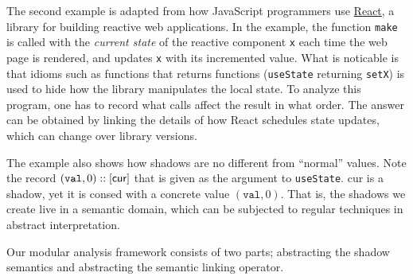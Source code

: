 The second example is adapted from how JavaScript programmers use \href{https://react.dev/}{React}, a library for building reactive web applications.
In the example, the function \texttt{make} is called with the \emph{current state} of the reactive component \texttt{x} each time the web page is rendered, and updates \texttt{x} with its incremented value.
What is noticable is that idioms such as functions that returns functions (\texttt{useState} returning \texttt{setX}) is used to hide how the library manipulates the local state.
To analyze this program, one has to record what calls affect the result in what order.
The answer can be obtained by linking the details of how React schedules state updates, which can change over library versions.

The example also shows how shadows are no different from ``normal'' values.
Note the record $(\texttt{val},0)::[\textsf{cur}]$ that is given as the argument to \texttt{useState}.
\textsf{cur} is a shadow, yet it is consed with a concrete value $(\texttt{val},0)$.
That is, the shadows we create live in a semantic domain, which can be subjected to regular techniques in abstract interpretation.

Our modular analysis framework consists of two parts; abstracting the shadow semantics and abstracting the semantic linking operator.

